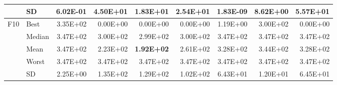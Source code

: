 \documentclass[10pt,a4paper]{article}
\newcommand{\bestval}[1]{\textbf{#1}}
\begin{document}
\begin{table}[p]
\begin{tabular}{llrrrrrrr}
 & SD & 6.02E-01 & 4.50E+01 & 1.83E+01 & 2.54E+01 & 1.83E-09 & 8.62E+00 & 5.57E+01 \\
\midrule
F10 & Best & 3.35E+02 & 0.00E+00 & 0.00E+00 & 0.00E+00 & 1.19E+00 & 3.00E+02 & 0.00E+00 \\
 & Median & 3.47E+02 & 3.00E+02 & 2.99E+02 & 3.00E+02 & 3.47E+02 & 3.47E+02 & 3.47E+02 \\
 & Mean & 3.47E+02 & 2.23E+02 & \bestval{1.92E+02} & 2.61E+02 & 3.28E+02 & 3.44E+02 & 3.28E+02 \\
 & Worst & 3.47E+02 & 3.47E+02 & 3.47E+02 & 3.47E+02 & 3.47E+02 & 3.47E+02 & 3.47E+02 \\
 & SD & 2.25E+00 & 1.35E+02 & 1.29E+02 & 1.02E+02 & 6.43E+01 & 1.20E+01 & 6.45E+01 \\
\bottomrule
\end{tabular}
\end{table}
\end{document}
